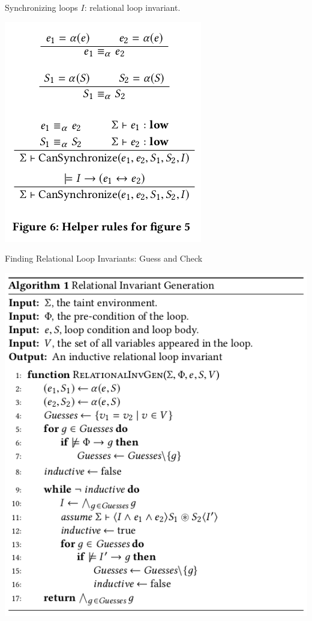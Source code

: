 \documentclass[page number]{beamer}
\begin{document}
\begin{frame}{Synchronizing loops}
  $I$: relational loop invariant.
  \vfill
  \begin{center}
    \includegraphics[scale=0.4]{img_chen/6.png}
  \end{center}
\end{frame}

\begin{frame}{Finding Relational Loop Invariants: Guess and Check}
  \begin{center}
    \includegraphics[scale=0.35]{img_chen/algo1.png}
  \end{center}
\end{frame}
\end{document}
